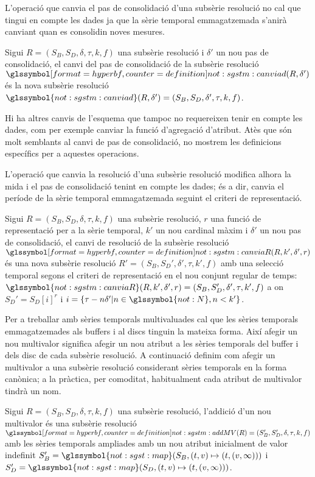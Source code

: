 L'operació que canvia el pas de consolidació d'una subsèrie resolució
no cal que tingui en compte les dades ja que la sèrie temporal
emmagatzemada s'anirà canviant quan es consolidin noves mesures.
\begin{definition}
  \label{def:sgstm:canviad}
  Sigui $R = (S_B,S_D,\delta,\tau,k,f)$ una subsèrie resolució i
  $\delta'$ un nou pas de consolidació, el canvi del pas de
  consolidació de la subsèrie resolució
  $\glssymboldef{not:sgstm:canviad}(R,\delta')$ és la nova subsèrie resolució
  $\glssymbol{not:sgstm:canviad}(R,\delta')=(S_B,S_D,\delta',\tau,k,f)$.
\end{definition}

Hi ha altres canvis de l'esquema que tampoc no requereixen tenir en
compte les dades, com per exemple canviar la funció d'agregació
d'atribut. Atès que són molt semblants al canvi de pas de
consolidació, no mostrem les definicions específics per a aquestes
operacions.


L'operació que canvia la resolució d'una subsèrie resolució modifica
alhora la mida i el pas de consolidació tenint en compte les dades; és
a dir, canvia el període de la sèrie temporal emmagatzemada seguint el
criteri de representació.
\begin{definition}
  Sigui $R = (S_B,S_D,\delta,\tau,k,f)$ una subsèrie resolució, $r$
  una funció de representació per a la sèrie temporal, $k'$ un nou
  cardinal màxim i $\delta'$ un nou pas de consolidació, el canvi de
  resolució de la subsèrie resolució
  $\glssymboldef{not:sgstm:canviaR}(R,k',\delta',r)$ és una nova subsèrie
  resolució $R' = (S_B,S_D',\delta',\tau,k',f)$ amb una selecció
  temporal segons el criteri de representació en el nou conjunt
  regular de temps:
  $\glssymbol{not:sgstm:canviaR}(R,k',\delta',r)=(S_B,S_D',\delta',\tau,k',f)$
  a on $S_D' = S_D[i]^r$ i $i=\{ \tau-n\delta' | n\in\glssymbol{not:N},n<k'
  \}$.
\end{definition}


Per a treballar amb sèries temporals multivaluades cal que les sèries
temporals emmagatzemades als buffers i al discs tinguin la mateixa
forma. Així afegir un nou multivalor significa afegir un nou atribut a
les sèries temporals del buffer i dels disc de cada subsèrie
resolució. A continuació definim com afegir un multivalor a una
subsèrie resolució considerant sèries temporals en la forma canònica;
a la pràctica, per comoditat, habitualment cada atribut de multivalor
tindrà un nom.
\begin{definition}
  Sigui $R = (S_B,S_D,\delta,\tau,k,f)$ una subsèrie resolució,
  l'addició d'un nou multivalor és una subsèrie resolució
  $\glssymboldef{not:sgstm:addMV}(R) = (S_B',S_D',\delta,\tau,k,f)$
  amb les sèries temporals ampliades amb un nou atribut inicialment de
  valor indefinit $S'_{B} =
  \glssymbol{not:sgst:map}(S_B,(t,v)\mapsto(t,(v,\infty)))$ i $S'_{D}
  = \glssymbol{not:sgst:map}(S_D,(t,v)\mapsto(t,(v,\infty)))$.
\end{definition}

